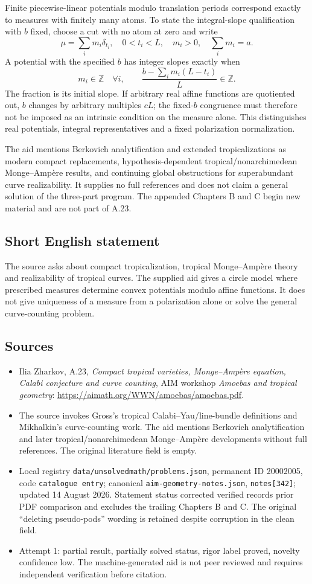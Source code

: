 \documentclass[11pt]{article}
\newcommand{\Z}{\mathbb{Z}}
\begin{document}
Finite piecewise-linear potentials modulo translation periods correspond exactly to measures with finitely many atoms. To state the integral-slope qualification with \(b\) fixed, choose a cut with no atom at zero and write
\[
\mu=\sum_i m_i\delta_{t_i},\quad0<t_i<L,\quad m_i>0,\quad\sum_i m_i=a.
\]
A potential with the specified \(b\) has integer slopes exactly when
\[
m_i\in\Z\quad\forall i,\qquad
\frac{b-\sum_i m_i(L-t_i)}L\in\Z.
\]
The fraction is its initial slope. If arbitrary real affine functions are quotiented out, \(b\) changes by arbitrary multiples \(cL\); the fixed-\(b\) congruence must therefore not be imposed as an intrinsic condition on the measure alone. This distinguishes real potentials, integral representatives and a fixed polarization normalization.

The aid mentions Berkovich analytification and extended tropicalizations as modern compact replacements, hypothesis-dependent tropical/nonarchimedean Monge--Amp\`ere results, and continuing global obstructions for superabundant curve realizability. It supplies no full references and does not claim a general solution of the three-part program. The appended Chapters B and C begin new material and are not part of A.23.
\subsection{Short English statement}
The source asks about compact tropicalization, tropical Monge--Amp\`ere theory and realizability of tropical curves. The supplied aid gives a circle model where prescribed measures determine convex potentials modulo affine functions. It does not give uniqueness of a measure from a polarization alone or solve the general curve-counting problem.
\subsection{Sources}
\begin{itemize}
\item Ilia Zharkov, A.23, \emph{Compact tropical varieties, Monge--Amp\`ere equation, Calabi conjecture and curve counting}, AIM workshop \emph{Amoebas and tropical geometry}: \url{https://aimath.org/WWN/amoebas/amoebas.pdf}.
\item The source invokes Gross's tropical Calabi--Yau/line-bundle definitions and Mikhalkin's curve-counting work. The aid mentions Berkovich analytification and later tropical/nonarchimedean Monge--Amp\`ere developments without full references. The original literature field is empty.
\item Local registry \texttt{data/unsolvedmath/problems.json}, permanent ID 20002005, code \texttt{catalogue entry}; canonical \texttt{aim-geometry-notes.json}, \texttt{notes[342]}; updated 14 August 2026. Statement status corrected verified records prior PDF comparison and excludes the trailing Chapters B and C. The original ``deleting pseudo-pods'' wording is retained despite corruption in the clean field.
\item Attempt 1: partial result, partially solved status, rigor label proved, novelty confidence low. The machine-generated aid is not peer reviewed and requires independent verification before citation.
\end{itemize}
\end{document}
